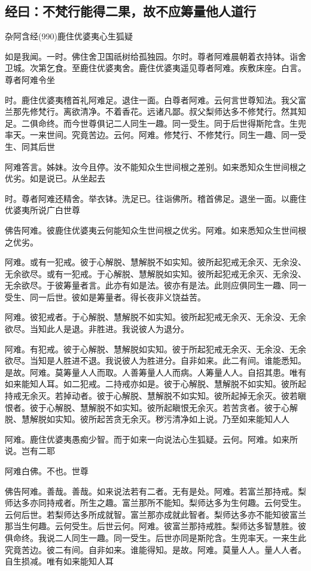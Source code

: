 \documentclass{book}
\begin{document}
\subsection{经曰：不梵行能得二果，故不应筹量他人道行}

杂阿含经(990)鹿住优婆夷心生狐疑

如是我闻。一时。佛住舍卫国祇树给孤独园。尔时。尊者阿难晨朝着衣持钵。诣舍卫城。次第乞食。至鹿住优婆夷舍。鹿住优婆夷遥见尊者阿难。疾敷床座。白言。尊者阿难令坐

时。鹿住优婆夷稽首礼阿难足。退住一面。白尊者阿难。云何言世尊知法。我父富兰那先修梵行。离欲清净。不着香花。远诸凡鄙。叔父梨师达多不修梵行。然其知足。二俱命终。而今世尊俱记二人同生一趣。同一受生。同于后世得斯陀含。生兜率天。一来世间。究竟苦边。云何。阿难。修梵行、不修梵行。同生一趣、同一受生、同其后世

阿难答言。姊妹。汝今且停。汝不能知众生世间根之差别。如来悉知众生世间根之优劣。如是说已。从坐起去

时。尊者阿难还精舍。举衣钵。洗足已。往诣佛所。稽首佛足。退坐一面。以鹿住优婆夷所说广白世尊

佛告阿难。彼鹿住优婆夷云何能知众生世间根之优劣。阿难。如来悉知众生世间根之优劣。

阿难。或有一犯戒。彼于心解脱、慧解脱不如实知。彼所起犯戒无余灭、无余没、无余欲尽。或有一犯戒。于心解脱、慧解脱如实知。彼所起犯戒无余灭、无余没、无余欲尽。于彼筹量者言。此亦有如是法。彼亦有是法。此则应俱同生一趣、同一受生、同一后世。彼如是筹量者。得长夜非义饶益苦。

阿难。彼犯戒者。于心解脱、慧解脱不如实知。彼所起犯戒无余灭、无余没、无余欲尽。当知此人是退。非胜进。我说彼人为退分。

阿难。有犯戒。彼于心解脱、慧解脱如实知。彼于所起犯戒无余灭、无余没、无余欲尽。当知是人胜进不退。我说彼人为胜进分。自非如来。此二有间。谁能悉知。是故。阿难。莫筹量人人而取。人善筹量人人而病。人筹量人人。自招其患。唯有如来能知人耳。如二犯戒。二持戒亦如是。彼于心解脱、慧解脱不如实知。彼所起持戒无余灭。若掉动者。彼于心解脱、慧解脱不如实知。彼所起掉无余灭。彼若瞋恨者。彼于心解脱、慧解脱不如实知。彼所起瞋恨无余灭。若苦贪者。彼于心解脱、慧解脱如实知。彼所起苦贪无余灭。秽污清净如上说。乃至如来能知人人

阿难。鹿住优婆夷愚痴少智。而于如来一向说法心生狐疑。云何。阿难。如来所说。岂有二耶

阿难白佛。不也。世尊

佛告阿难。善哉。善哉。如来说法若有二者。无有是处。阿难。若富兰那持戒。梨师达多亦同持戒者。所生之趣。富兰那所不能知。梨师达多为生何趣。云何受生。云何后世。若梨师达多所成就智。富兰那亦成就此智者。梨师达多亦不能知彼富兰那当生何趣。云何受生。后世云何。阿难。彼富兰那持戒胜。梨师达多智慧胜。彼俱命终。我说二人同生一趣。同一受生。后世亦同是斯陀含。生兜率天。一来生此究竟苦边。彼二有间。自非如来。谁能得知。是故。阿难。莫量人人。量人人者。自生损减。唯有如来能知人耳
\end{document}
